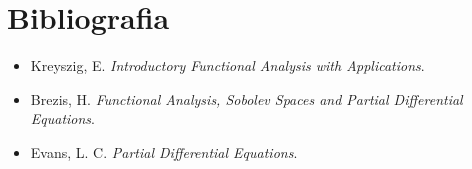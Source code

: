 \section*{Bibliografia}
\begin{itemize}
  \item \label{kreyz} Kreyszig, E. \textit{Introductory Functional Analysis with Applications}.
  \item \label{brez} Brezis, H. \textit{Functional Analysis, Sobolev Spaces and Partial Differential Equations}.
  \item \label{evans} Evans, L. C. \textit{Partial Differential Equations}.
\end{itemize}



